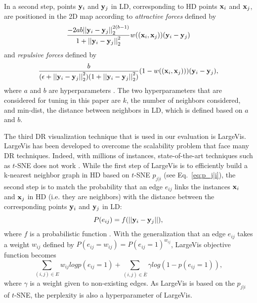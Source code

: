 In a second step, points ${\bf y}_i$ and ${\bf y}_j$ in LD, corresponding to HD points ${\bf x}_i$ and ${\bf x}_j$, are positioned in the 2D map according to \textit{attractive forces} defined by
\begin{equation}
    \frac{-2ab{||{\bf y}_i - {\bf y}_j||}^{2(b-1)}_2}{1+{||{\bf y}_i - {\bf y}_j||}^2_2}w(({\bf x}_i, {\bf x}_j))({\bf y}_i - {\bf y}_j)
\end{equation}
and \textit{repulsive forces} defined by
\begin{equation}
    \frac{b}{(\epsilon+{||{\bf y}_i - {\bf y}_j||}^2_2)(1+{||{\bf y}_i - {\bf y}_j||}^2_2)}(1-w(({\bf x}_i, {\bf x}_j)))({\bf y}_i - {\bf y}_j),
\end{equation}
where $a$ and $b$ are hyperparameters \cite{mcinnes2018umap}. The two hyperparameters that are considered for tuning in this paper are $k$, the number of neighbors considered, and min-dist, the distance between neighbors in LD, which is defined based on $a$ and $b$. 

The third DR visualization technique that is used in our evaluation is LargeVis. LargeVis has been developed to overcome the scalability problem that face many DR techniques. Indeed, with millions of instances, state-of-the-art techniques such as $t$-SNE does not work \cite{tang2016visualizing}. While the first step of LargeVis is to efficiently build a k-nearest neighbor graph in HD based on $t$-SNE $p_{j|i}$ (see Eq.~\ref{eq:p_j|i}), the second step is to match the probability that an edge $e_{ij}$ links the instances ${\bf x}_i$ and ${\bf x}_j$ in HD (i.e. they are neighbors) with the distance between the corresponding points ${\bf y}_i$ and ${\bf y}_j$ in LD:
\begin{equation}
    P(e_{ij}) = f(||{\bf y}_i - {\bf y}_j||),
\end{equation}
where $f$ is a probabilistic function \cite{tang2016visualizing}. With the generalization that an edge $e_{ij}$ takes a weight $w_{ij}$ defined by $P(e_{ij} = w_{ij}) = P(e_{ij} = 1)^{w_{ij}}$, LargeVis objective function becomes
\begin{equation}
    \sum_{(i,j) \in E} w_{ij}logp(e_{ij} = 1) + \sum_{(i,j) \in \bar{E}} \gamma log(1 - p(e_{ij} = 1)),
\end{equation}
where $\gamma$ is a weight given to non-existing edges. As LargeVis is based on the $p_{j|i}$ of $t$-SNE, the perplexity is also a hyperparameter of LargeVis.


